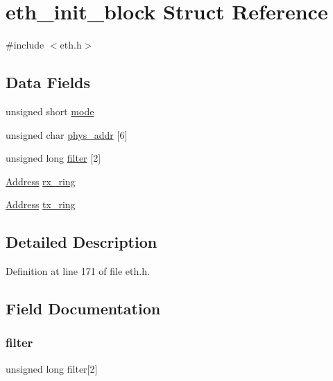 \hypertarget{structeth__init__block}{}\section{eth\+\_\+init\+\_\+block Struct Reference}
\label{structeth__init__block}


{\ttfamily \#include $<$eth.\+h$>$}

\subsection*{Data Fields}
\begin{DoxyCompactItemize}
\item 
unsigned short \hyperlink{structeth__init__block_a1d1a704ce66a2b0fa1b914233418a672}{mode}
\item 
unsigned char \hyperlink{structeth__init__block_a67e5a5231d014e64a51f257b7014031d}{phys\+\_\+addr} \mbox{[}6\mbox{]}
\item 
unsigned long \hyperlink{structeth__init__block_a674db131391bfb7036137112418eff1b}{filter} \mbox{[}2\mbox{]}
\item 
\hyperlink{tap_8h_a40606a38de2ce007717541a358bab07b}{Address} \hyperlink{structeth__init__block_ae3fb0d22dc23e8b5d08b2c4b7021d462}{rx\+\_\+ring}
\item 
\hyperlink{tap_8h_a40606a38de2ce007717541a358bab07b}{Address} \hyperlink{structeth__init__block_a68a821268bfded577a82a02847941e78}{tx\+\_\+ring}
\end{DoxyCompactItemize}


\subsection{Detailed Description}


Definition at line 171 of file eth.\+h.



\subsection{Field Documentation}
\hypertarget{structeth__init__block_a674db131391bfb7036137112418eff1b}{}\label{structeth__init__block_a674db131391bfb7036137112418eff1b} 
\subsubsection{\texorpdfstring{filter}{filter}}
{\footnotesize\ttfamily unsigned long filter\mbox{[}2\mbox{]}}




